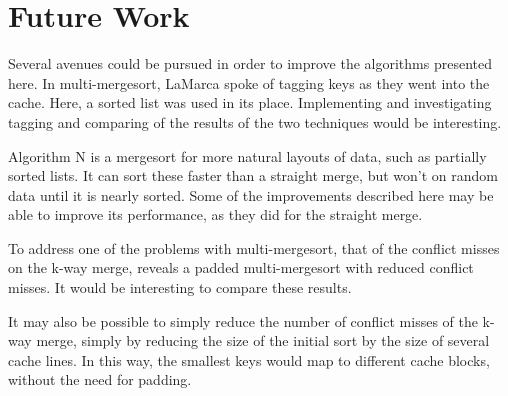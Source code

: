 \section{Future Work}
Several avenues could be pursued in order to improve the algorithms presented
here. In multi-mergesort, LaMarca spoke of tagging keys as they went into the
cache. Here, a sorted list was used in its place. Implementing and investigating
tagging and comparing of the results of the two techniques would be interesting.

Algorithm N is a mergesort for more natural layouts of data, such as partially
sorted lists. It can sort these faster than a straight merge, but won't on
random data until it is nearly sorted. Some of the improvements described here
may be able to improve its performance, as they did for the straight merge.

To address one of the problems with multi-mergesort, that of the conflict misses
on the k-way merge, \cite{Xiao00} reveals a padded multi-mergesort with reduced 
conflict misses. It would be interesting to compare these results.

It may also be possible to simply reduce the number of conflict misses of the
k-way merge, simply by reducing the size of the initial sort by the size of
several cache lines. In this way, the smallest keys would map to different
cache blocks, without the need for padding.
